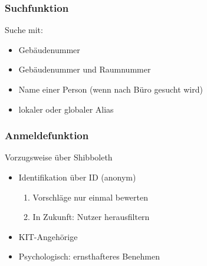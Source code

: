 \begin{frame}\frametitle{Suchfunktion}
    Suche mit:
    \begin{itemize}
        \item Gebäudenummer
        \item Gebäudenummer und Raumnummer
        \item Name einer Person (wenn nach Büro gesucht wird)
        \item lokaler oder globaler Alias
    \end{itemize}
\end{frame}

\begin{frame}\frametitle{Anmeldefunktion}
    Vorzugsweise über Shibboleth
    \begin{itemize}
        \item Identifikation über ID (anonym)
              \begin{enumerate}
                  \item Vorschläge nur einmal bewerten
                  \item In Zukunft: Nutzer herausfiltern
              \end{enumerate}
        \item KIT-Angehörige
        \item Psychologisch: ernsthafteres Benehmen
    \end{itemize}
\end{frame}

\begin{frame}\frametitle{Alias hinzufügen}
    \begin{figure}
        \texttt{[image: \\relimgfile\{Alias\_Prozess.png]}}
        \vfill\null
    \end{figure}
    \vfill\null
\end{frame}
